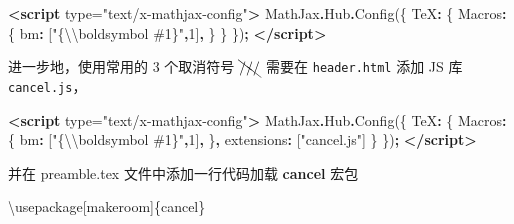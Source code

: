 \documentclass[
  lang=cn,
  11pt,
  scheme=chinese,
  chinesefont=nofont,
  citestyle=gb7714-2015,
  bibstyle=gb7714-2015]{elegantbook}
\newenvironment{Shaded}{\begin{snugshade}}{\end{snugshade}}
\newcommand{\AttributeTok}[1]{\textcolor[rgb]{0.77,0.63,0.00}{#1}}
\newcommand{\BuiltInTok}[1]{#1}
\newcommand{\DataTypeTok}[1]{\textcolor[rgb]{0.13,0.29,0.53}{#1}}
\newcommand{\DecValTok}[1]{\textcolor[rgb]{0.00,0.00,0.81}{#1}}
\newcommand{\ExtensionTok}[1]{#1}
\newcommand{\FunctionTok}[1]{\textcolor[rgb]{0.00,0.00,0.00}{#1}}
\newcommand{\KeywordTok}[1]{\textcolor[rgb]{0.13,0.29,0.53}{\textbf{#1}}}
\newcommand{\NormalTok}[1]{#1}
\newcommand{\OperatorTok}[1]{\textcolor[rgb]{0.81,0.36,0.00}{\textbf{#1}}}
\newcommand{\OtherTok}[1]{\textcolor[rgb]{0.56,0.35,0.01}{#1}}
\newcommand{\SpecialCharTok}[1]{\textcolor[rgb]{0.00,0.00,0.00}{#1}}
\newcommand{\StringTok}[1]{\textcolor[rgb]{0.31,0.60,0.02}{#1}}
\begin{document}
\begin{Shaded}
\begin{Highlighting}[]
\KeywordTok{\textless{}script}\OtherTok{ type=}\StringTok{"text/x{-}mathjax{-}config"}\KeywordTok{\textgreater{}}
\NormalTok{    MathJax}\OperatorTok{.}\AttributeTok{Hub}\OperatorTok{.}\FunctionTok{Config}\NormalTok{(\{}
      \DataTypeTok{TeX}\OperatorTok{:}\NormalTok{ \{}
        \DataTypeTok{Macros}\OperatorTok{:}\NormalTok{ \{}
          \DataTypeTok{bm}\OperatorTok{:}\NormalTok{ [}\StringTok{"\{}\SpecialCharTok{\textbackslash{}\textbackslash{}}\StringTok{boldsymbol \#1\}"}\OperatorTok{,}\DecValTok{1}\NormalTok{]}\OperatorTok{,}
\NormalTok{        \}}
\NormalTok{      \}}
\NormalTok{    \})}\OperatorTok{;}
\KeywordTok{\textless{}/script\textgreater{}}
\end{Highlighting}
\end{Shaded}

进一步地，使用常用的 3 个取消符号 \(\bcancel{///}\) 需要在 \texttt{header.html} 添加 JS 库 \texttt{cancel.js}，

\begin{Shaded}
\begin{Highlighting}[]
\KeywordTok{\textless{}script}\OtherTok{ type=}\StringTok{"text/x{-}mathjax{-}config"}\KeywordTok{\textgreater{}}
\NormalTok{    MathJax}\OperatorTok{.}\AttributeTok{Hub}\OperatorTok{.}\FunctionTok{Config}\NormalTok{(\{}
      \DataTypeTok{TeX}\OperatorTok{:}\NormalTok{ \{}
        \DataTypeTok{Macros}\OperatorTok{:}\NormalTok{ \{}
          \DataTypeTok{bm}\OperatorTok{:}\NormalTok{ [}\StringTok{"\{}\SpecialCharTok{\textbackslash{}\textbackslash{}}\StringTok{boldsymbol \#1\}"}\OperatorTok{,}\DecValTok{1}\NormalTok{]}\OperatorTok{,}
\NormalTok{        \}}\OperatorTok{,}
        \DataTypeTok{extensions}\OperatorTok{:}\NormalTok{ [}\StringTok{"cancel.js"}\NormalTok{]}
\NormalTok{      \}}
\NormalTok{    \})}\OperatorTok{;}
\KeywordTok{\textless{}/script\textgreater{}}
\end{Highlighting}
\end{Shaded}

并在 preamble.tex 文件中添加一行代码加载 \textbf{cancel} 宏包

\begin{Shaded}
\begin{Highlighting}[]
\BuiltInTok{\textbackslash{}usepackage}\NormalTok{[makeroom]\{}\ExtensionTok{cancel}\NormalTok{\}}
\end{Highlighting}
\end{Shaded}
\end{document}
